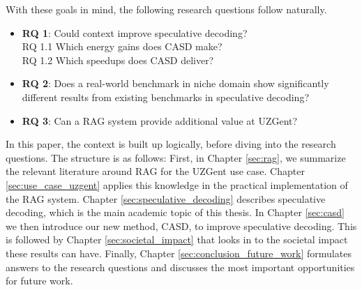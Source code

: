 With these goals in mind, the following research questions follow naturally.

\begin{itemize}
    \item \textbf{RQ 1}: Could context improve speculative decoding? \\ RQ 1.1 Which energy gains does CASD make? \\ RQ 1.2 Which speedups does CASD deliver?
    \item \textbf{RQ 2}: Does a real-world benchmark in niche domain show significantly different results from existing benchmarks in speculative decoding?
    \item \textbf{RQ 3}: Can a RAG system provide additional value at UZGent?
\end{itemize}

In this paper, the context is built up logically, before diving into the research questions. The structure is as follows: First, in Chapter \ref{sec:rag}, we summarize the relevant literature around RAG for the UZGent use case. Chapter \ref{sec:use_case_uzgent} applies this knowledge in the practical implementation of the RAG system. Chapter \ref{sec:speculative_decoding} describes speculative decoding, which is the main academic topic of this thesis. In Chapter \ref{sec:casd} we then introduce our new method, CASD, to improve speculative decoding. This is followed by Chapter \ref{sec:societal_impact} that looks in to the societal impact these results can have. Finally, Chapter \ref{sec:conclusion_future_work} formulates answers to the research questions and discusses the most important opportunities for future work.\\